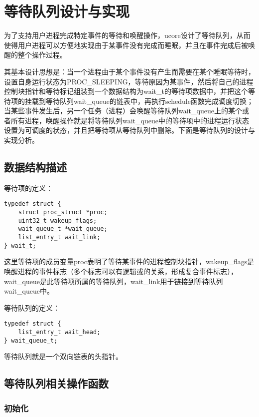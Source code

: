 \section{等待队列设计与实现}\label{ux7b49ux5f85ux961fux5217ux8bbeux8ba1ux4e0eux5b9eux73b0}

为了支持用户进程完成特定事件的等待和唤醒操作，ucore设计了等待队列，从而使得用户进程可以方便地实现由于某事件没有完成而睡眠，并且在事件完成后被唤醒的整个操作过程。

其基本设计思想是：当一个进程由于某个事件没有产生而需要在某个睡眠等待时，设置自身运行状态为PROC\_SLEEPING，等待原因为某事件，然后将自己的进程控制块指针和等待标记组装到一个数据结构为wait\_t的等待项数据中，并把这个等待项的挂载到等待队列wait\_queue的链表中，再执行schedule函数完成调度切换；当某些事件发生后，另一个任务（进程）会唤醒等待队列wait\_queue上的某个或者所有进程，唤醒操作就是将等待队列wait\_queue中的等待项中的进程运行状态设置为可调度的状态，并且把等待项从等待队列中删除。下面是等待队列的设计与实现分析。

\subsection{数据结构描述}\label{ux6570ux636eux7ed3ux6784ux63cfux8ff0}

等待项的定义：

\begin{lstlisting}
typedef struct {
    struct proc_struct *proc;
    uint32_t wakeup_flags;
    wait_queue_t *wait_queue;
    list_entry_t wait_link;
} wait_t;
\end{lstlisting}

这里等待项的成员变量proc表明了等待某事件的进程控制块指针，wakeup\_flags是唤醒进程的事件标志（多个标志可以有逻辑或的关系，形成复合事件标志），wait\_queue是此等待项所属的等待队列，wait\_link用于链接到等待队列wait\_queue中。

等待队列的定义：

\begin{lstlisting}
typedef struct {
    list_entry_t wait_head;
} wait_queue_t;
\end{lstlisting}

等待队列就是一个双向链表的头指针。

\subsection{等待队列相关操作函数}\label{ux7b49ux5f85ux961fux5217ux76f8ux5173ux64cdux4f5cux51fdux6570}

\subsubsection{初始化}\label{ux521dux59cbux5316}

